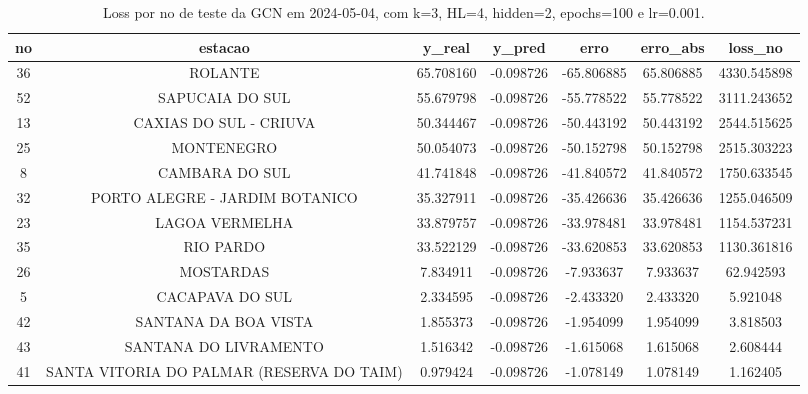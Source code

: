 \begin{table}[h]
\centering
\caption{Loss por no de teste da GCN em 2024-05-04, com k=3, HL=4, hidden=2, epochs=100 e lr=0.001.}
\label{tab:gcn_loss_k3_hl4_h2_e100_d20240504}
\begin{tabular}{ccccccc}
\toprule
no & estacao & y\_real & y\_pred & erro & erro\_abs & loss\_no \\
\midrule
36 & ROLANTE & 65.708160 & -0.098726 & -65.806885 & 65.806885 & 4330.545898 \\
52 & SAPUCAIA DO SUL & 55.679798 & -0.098726 & -55.778522 & 55.778522 & 3111.243652 \\
13 & CAXIAS DO SUL - CRIUVA & 50.344467 & -0.098726 & -50.443192 & 50.443192 & 2544.515625 \\
25 & MONTENEGRO & 50.054073 & -0.098726 & -50.152798 & 50.152798 & 2515.303223 \\
8 & CAMBARA DO SUL & 41.741848 & -0.098726 & -41.840572 & 41.840572 & 1750.633545 \\
32 & PORTO ALEGRE - JARDIM BOTANICO & 35.327911 & -0.098726 & -35.426636 & 35.426636 & 1255.046509 \\
23 & LAGOA VERMELHA & 33.879757 & -0.098726 & -33.978481 & 33.978481 & 1154.537231 \\
35 & RIO PARDO & 33.522129 & -0.098726 & -33.620853 & 33.620853 & 1130.361816 \\
26 & MOSTARDAS & 7.834911 & -0.098726 & -7.933637 & 7.933637 & 62.942593 \\
5 & CACAPAVA DO SUL & 2.334595 & -0.098726 & -2.433320 & 2.433320 & 5.921048 \\
42 & SANTANA DA BOA VISTA & 1.855373 & -0.098726 & -1.954099 & 1.954099 & 3.818503 \\
43 & SANTANA DO LIVRAMENTO & 1.516342 & -0.098726 & -1.615068 & 1.615068 & 2.608444 \\
41 & SANTA VITORIA DO PALMAR (RESERVA DO TAIM) & 0.979424 & -0.098726 & -1.078149 & 1.078149 & 1.162405 \\
\bottomrule
\end{tabular}
\end{table}
